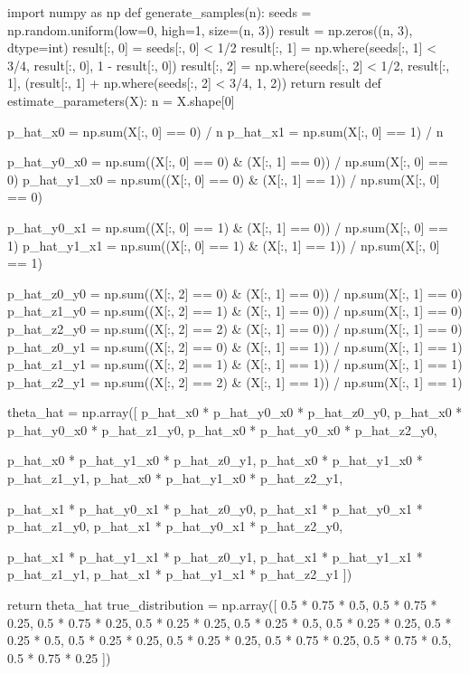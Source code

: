 \begin{python}
import numpy as np
def generate_samples(n):
    seeds = np.random.uniform(low=0, high=1, size=(n, 3))
    result = np.zeros((n, 3), dtype=int)
    result[:, 0] = seeds[:, 0] < 1/2
    result[:, 1] = np.where(seeds[:, 1] < 3/4, 
    result[:, 0], 1 - result[:, 0])
    result[:, 2] = np.where(seeds[:, 2] < 1/2, 
    result[:, 1], (result[:, 1] + np.where(seeds[:, 2] < 3/4, 1, 2)) %
    return result
def estimate_parameters(X):
    n = X.shape[0]
    
    p_hat_x0 = np.sum(X[:, 0] == 0) / n
    p_hat_x1 = np.sum(X[:, 0] == 1) / n
    
    p_hat_y0_x0 = np.sum((X[:, 0] == 0) & (X[:, 1] == 0)) / np.sum(X[:, 0] == 0)
    p_hat_y1_x0 = np.sum((X[:, 0] == 0) & (X[:, 1] == 1)) / np.sum(X[:, 0] == 0)
    
    p_hat_y0_x1 = np.sum((X[:, 0] == 1) & (X[:, 1] == 0)) / np.sum(X[:, 0] == 1)
    p_hat_y1_x1 = np.sum((X[:, 0] == 1) & (X[:, 1] == 1)) / np.sum(X[:, 0] == 1)
    
    p_hat_z0_y0 = np.sum((X[:, 2] == 0) & (X[:, 1] == 0)) / np.sum(X[:, 1] == 0)
    p_hat_z1_y0 = np.sum((X[:, 2] == 1) & (X[:, 1] == 0)) / np.sum(X[:, 1] == 0)
    p_hat_z2_y0 = np.sum((X[:, 2] == 2) & (X[:, 1] == 0)) / np.sum(X[:, 1] == 0)
    p_hat_z0_y1 = np.sum((X[:, 2] == 0) & (X[:, 1] == 1)) / np.sum(X[:, 1] == 1)
    p_hat_z1_y1 = np.sum((X[:, 2] == 1) & (X[:, 1] == 1)) / np.sum(X[:, 1] == 1)
    p_hat_z2_y1 = np.sum((X[:, 2] == 2) & (X[:, 1] == 1)) / np.sum(X[:, 1] == 1)
    
    theta_hat = np.array([
        p_hat_x0 * p_hat_y0_x0 * p_hat_z0_y0,
        p_hat_x0 * p_hat_y0_x0 * p_hat_z1_y0,
        p_hat_x0 * p_hat_y0_x0 * p_hat_z2_y0,
        
        p_hat_x0 * p_hat_y1_x0 * p_hat_z0_y1,
        p_hat_x0 * p_hat_y1_x0 * p_hat_z1_y1,
        p_hat_x0 * p_hat_y1_x0 * p_hat_z2_y1,
        
        p_hat_x1 * p_hat_y0_x1 * p_hat_z0_y0,
        p_hat_x1 * p_hat_y0_x1 * p_hat_z1_y0,
        p_hat_x1 * p_hat_y0_x1 * p_hat_z2_y0,
        
        p_hat_x1 * p_hat_y1_x1 * p_hat_z0_y1,
        p_hat_x1 * p_hat_y1_x1 * p_hat_z1_y1,
        p_hat_x1 * p_hat_y1_x1 * p_hat_z2_y1
    ])
    
    return theta_hat
true_distribution = np.array([
    0.5 * 0.75 * 0.5,
    0.5 * 0.75 * 0.25,
    0.5 * 0.75 * 0.25,
    0.5 * 0.25 * 0.25,
    0.5 * 0.25 * 0.5,
    0.5 * 0.25 * 0.25,
    0.5 * 0.25 * 0.5,
    0.5 * 0.25 * 0.25,
    0.5 * 0.25 * 0.25,
    0.5 * 0.75 * 0.25,
    0.5 * 0.75 * 0.5,
    0.5 * 0.75 * 0.25
])
\end{python}

